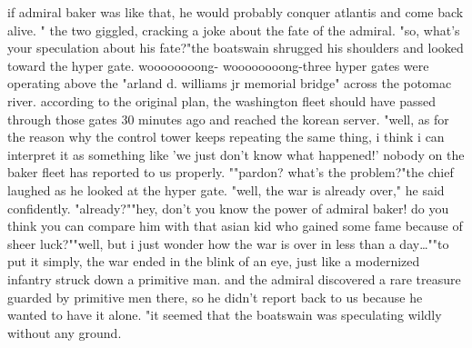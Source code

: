  if admiral baker was like that, he would probably conquer atlantis and come back alive.
"
the two giggled, cracking a joke about the fate of the admiral.
"so, what's your speculation about his fate?"the boatswain shrugged his shoulders and looked toward the hyper gate.
woooooooong- woooooooong-three hyper gates were operating above the "arland d.
 williams jr memorial bridge" across the potomac river.
 according to the original plan, the washington fleet should have passed through those gates 30 minutes ago and reached the korean server.
"well, as for the reason why the control tower keeps repeating the same thing, i think i can interpret it as something like 'we just don't know what happened!' nobody on the baker fleet has reported to us properly.
""pardon? what's the problem?"the chief laughed as he looked at the hyper gate.
"well, the war is already over," he said confidently.
 "already?""hey, don't you know the power of admiral baker! do you think you can compare him with that asian kid who gained some fame because of sheer luck?""well, but i just wonder how the war is over in less than a day…""to put it simply, the war ended in the blink of an eye, just like a modernized infantry struck down a primitive man.
 and the admiral discovered a rare treasure guarded by primitive men there, so he didn't report back to us because he wanted to have it alone.
"it seemed that the boatswain was speculating wildly without any ground.
 
